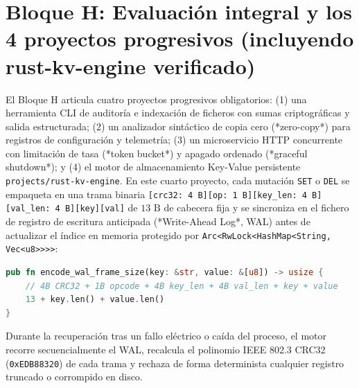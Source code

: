 \documentclass{book}
\begin{document}
\section{Bloque H: Evaluación integral y los 4 proyectos progresivos (incluyendo rust-kv-engine verificado)}

El Bloque H articula cuatro proyectos progresivos obligatorios: (1) una herramienta CLI de auditoría e indexación de ficheros con sumas criptográficas y salida estructurada; (2) un analizador sintáctico de copia cero (*zero-copy*) para registros de configuración y telemetría; (3) un microservicio HTTP concurrente con limitación de tasa (*token bucket*) y apagado ordenado (*graceful shutdown*); y (4) el motor de almacenamiento Key-Value persistente \texttt{projects/rust-kv-engine}. En este cuarto proyecto, cada mutación \texttt{SET} o \texttt{DEL} se empaqueta en una trama binaria \texttt{[crc32: 4 B][op: 1 B][key\_len: 4 B][val\_len: 4 B][key][val]} de \(13\text{ B}\) de cabecera fija y se sincroniza en el fichero de registro de escritura anticipada (*Write-Ahead Log*, WAL) antes de actualizar el índice en memoria protegido por \texttt{Arc<RwLock<HashMap<String, Vec<u8>>>>}:
\begin{lstlisting}[style=studium,language={Rust}]
pub fn encode_wal_frame_size(key: &str, value: &[u8]) -> usize {
    // 4B CRC32 + 1B opcode + 4B key_len + 4B val_len + key + value
    13 + key.len() + value.len()
}
\end{lstlisting}
Durante la recuperación tras un fallo eléctrico o caída del proceso, el motor recorre secuencialmente el WAL, recalcula el polinomio IEEE 802.3 CRC32 (\texttt{0xEDB88320}) de cada trama y rechaza de forma determinista cualquier registro truncado o corrompido en disco.
\end{document}
